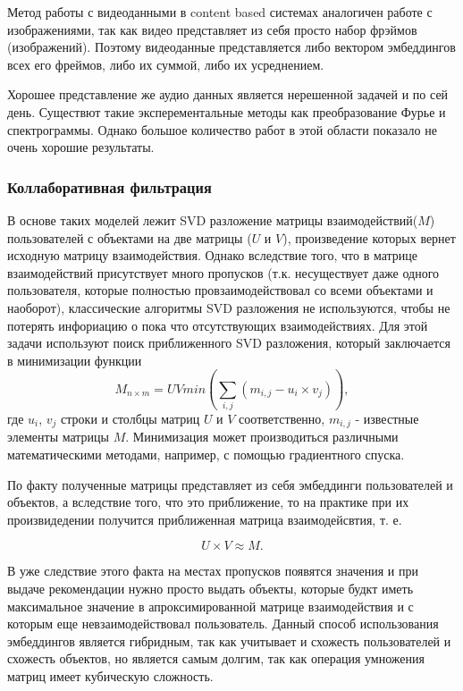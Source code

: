 \documentclass[bachelor, och, coursework]{SCWorks}
\begin{document}
Метод работы с видеоданными в content based системах аналогичен работе с изображениями, так как видео представляет
из себя просто набор фрэймов (изображений). Поэтому видеоданные представляется либо вектором эмбеддингов всех его фреймов,
либо их суммой, либо их усреднением.

Хорошее представление же аудио данных является нерешенной задачей и по сей день. Существют такие эксперементальные
методы как преобразование Фурье и спектрограммы. Однако большое количество работ в этой области показало не очень
хорошие результаты.
\subsubsection{Коллаборативная фильтрация}
В основе таких моделей лежит SVD разложение матрицы взаимодействий($M$) пользователей с объектами на две матрицы ($U$ и $V$),
произведение которых вернет исходную матрицу взаимодействия. Однако вследствие того, что в матрице взаимодействий присутствует много
пропусков (т.к. несуществует даже одного пользователя, которые полностью провзаимодействовал со всеми объектами
и наоборот), классические алгоритмы SVD разложения не используются, чтобы не потерять инфориацию о пока что отсутствующих
взаимодействиях. Для этой задачи используют поиск приближенного SVD разложения, который заключается в минимизации
функции 
\begin{equation}
    M_{n\times m} = UVmin(\sum_{i,j}(m_{i,j}-u_i \times v_j)),
\end{equation}
где $u_i$, $v_j$ строки и столбцы матриц $U$ и $V$ соответственно, $m_{i,j}$ - известные элементы матрицы $M$.
Минимизация может производиться различными математическими методами, например, с помощью градиентного спуска.

По факту полученные матрицы представляет из себя эмбеддинги пользователей и объектов, а вследствие того, что это приближение,
то на практике при их произвидедении получится приближенная матрица взаимодейсвтия, т. е.

\begin{equation}
    U \times V \approx M.
\end{equation}

В уже следствие этого факта на местах пропусков появятся значения и при выдаче рекомендации нужно просто
выдать объекты, которые будкт иметь максимальное значение в апроксимированной матрице взаимодействия
и с которым еще невзаимодействовал пользователь. Данный способ использования эмбеддингов является
гибридным, так как учитывает и схожесть пользователей и схожесть объектов, но является самым долгим,
так как операция умножения матриц имеет кубическую сложность.
\end{document}
